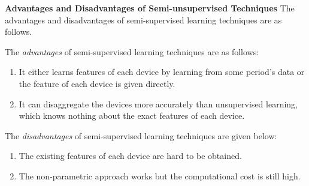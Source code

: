 \textbf{Advantages and Disadvantages of Semi-unsupervised Techniques}
The advantages and disadvantages of semi-supervised learning techniques are as follows.

The \textit{advantages} of semi-supervised learning techniques are as follows:
\begin{enumerate}
\item It either learns features of each device by learning from some period's data or the feature of each device is given directly. 
\item It can disaggregate the devices more accurately than unsupervised learning, 
which knows nothing about the exact features of each device. 
\end{enumerate}


The \textit{disadvantages} of semi-supervised learning techniques are given below:
\begin{enumerate}
\item The existing features of each device are hard to be obtained. 
\item The non-parametric approach works but the computational cost is still high.
\end{enumerate}



%
%
%


